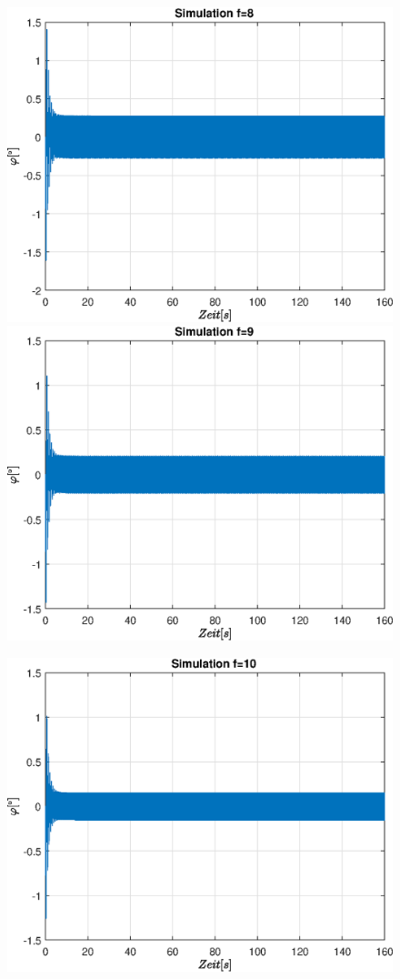 \documentclass{article}
\begin{document}
\begin{figure}[!h]
\includegraphics[width=0.5\linewidth]{img/sim_phi_sine_freq_8}
\includegraphics[width=0.5\linewidth]{img/sim_phi_sine_freq_9}
\end{figure}
\begin{figure}[!h]
\centering
\includegraphics[width=0.5\linewidth]{img/sim_phi_sine_freq_10}
\end{figure}

\newpage
\end{document}
